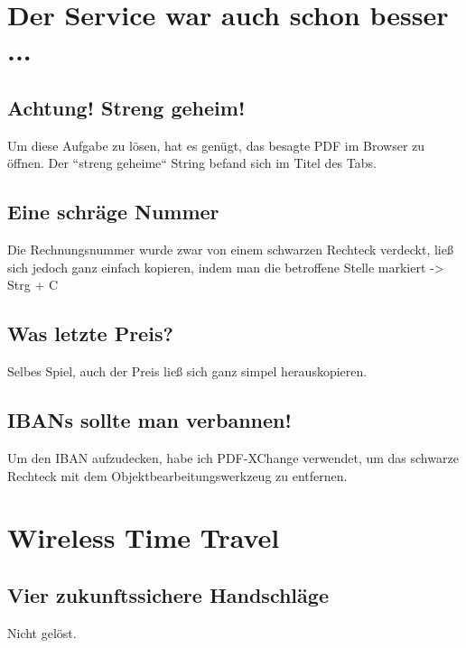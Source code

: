 \documentclass[12pt,a4paper,titlepage,oneside]{scrartcl}
\begin{document}
\maketitle
\setcounter{section}{0}
\setcounter{tocdepth}{2}
\tableofcontents

%
%
\newpage

\section{Der Service war auch schon besser ...}

\subsection{Achtung! Streng geheim!}
Um diese Aufgabe zu l\"osen, hat es gen\"ugt, das besagte PDF im Browser zu \"offnen. Der ``streng geheime`` String befand sich im Titel des Tabs.

\subsection{Eine schräge Nummer}
Die Rechnungsnummer wurde zwar von einem schwarzen Rechteck verdeckt, ließ sich jedoch ganz einfach kopieren, indem man die betroffene Stelle markiert -> Strg + C

\subsection{Was letzte Preis?}
Selbes Spiel, auch der Preis ließ sich ganz simpel herauskopieren.

\subsection{IBANs sollte man verbannen!}
Um den IBAN aufzudecken, habe ich PDF-XChange verwendet, um das schwarze Rechteck mit dem Objektbearbeitungswerkzeug zu entfernen.


\section{Wireless Time Travel}

\subsection{Vier zukunftssichere Handschl\"age}
Nicht gelöst.
\end{document}
